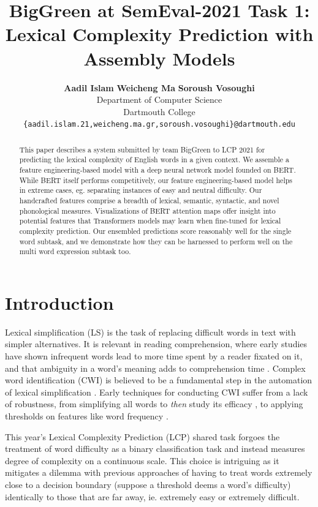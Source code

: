 \documentclass[11pt,a4paper]{article}
\title{BigGreen at SemEval-2021 Task 1: \\
Lexical Complexity Prediction with Assembly Models}
\author{
  \textbf{Aadil Islam}\normalfont{,} \textbf{Weicheng Ma}\normalfont{,} \textbf{Soroush Vosoughi}\\
  Department of Computer Science\\
  Dartmouth College\\
  \texttt{\{aadil.islam.21,weicheng.ma.gr,soroush.vosoughi\}@dartmouth.edu}
}
\date{}
\begin{document}
\maketitle

\begin{abstract}
  This paper describes a system submitted by team BigGreen to LCP 2021 for predicting the lexical complexity of English words in a given context. We assemble a feature engineering-based model with a deep neural network model founded on BERT. While BERT itself performs competitively, our feature engineering-based model helps in extreme cases, eg. separating instances of easy and neutral difficulty. Our handcrafted features comprise a breadth of lexical, semantic, syntactic, and novel phonological measures. Visualizations of BERT attention maps offer insight into potential features that Transformers models may learn when fine-tuned for lexical complexity prediction. Our ensembled predictions score reasonably well for the single word subtask, and we demonstrate how they can be harnessed to perform well on the multi word expression subtask too.
\end{abstract}

\section{Introduction}

Lexical simplification (LS) is the task of replacing difficult words in text with simpler alternatives. It is relevant in reading comprehension, where early studies have shown infrequent words lead to more time spent by a reader fixated on it, and that ambiguity in a word's meaning adds to comprehension time \citep{rayner1986lexical}. Complex word identification (CWI) is believed to be a fundamental step in the automation of lexical simplification \citep{shardlow2014out}. Early techniques for conducting CWI suffer from a lack of robustness, from simplifying all words to \textit{then} study its efficacy \citep{devlin1998use}, to applying thresholds on features like word frequency \citep{zeng2005text}. 

This year's Lexical Complexity Prediction (LCP) shared task \citep{shardlow2021semeval} forgoes the treatment of word difficulty as a binary classification task \citep{paetzold2016semeval, yimam2018report} and instead measures degree of complexity on a continuous scale. This choice is intriguing as it mitigates a dilemma with previous approaches of having to treat words extremely close to a decision boundary (suppose a threshold deems a word's difficulty) identically to those that are far away, ie. extremely easy or extremely difficult.
\end{document}
